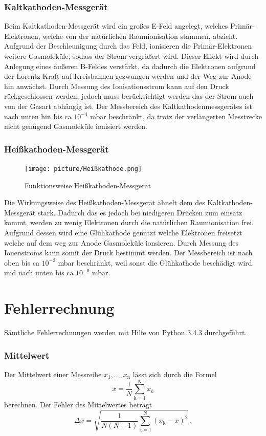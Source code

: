 \subsubsection{Kaltkathoden-Messgerät}
Beim Kaltkathoden-Messgerät wird ein großes E-Feld angelegt, welches Primär-Elektronen, welche von der natürlichen Raumionisation stammen, abzieht. Aufgrund der Beschleunigung durch das Feld, ionisieren die Primär-Elektronen weitere Gasmoleküle, sodass der Strom vergrößert wird. Dieser Effekt wird durch Anlegung eines äußeren B-Feldes verstärkt, da dadurch die Elektronen aufgrund der Lorentz-Kraft auf Kreisbahnen gezwungen werden und der Weg zur Anode hin anwächst. Durch Messung des Ionisationsstrom kann auf den Druck rückgeschlossen werden, jedoch muss berücksichtigt werden das der Strom auch von der Gasart abhängig ist. Der Messbereich des Kaltkathodenmessgerätes ist nach unten hin bis ca $10^{-4}$ mbar beschränkt, da trotz der verlängerten Messtrecke nicht genügend Gasmoleküle ionisiert werden.

\subsubsection{Heißkathoden-Messgerät}
\begin{figure}
  \vspace{-1.0cm}
  \centering
  \texttt{[image: picture/Heißkathode.png]}
  \caption{Funktionsweise Heißkathoden-Messgerät \cite{Heiss}}
  \label{fig:Heißkathode}
  \vspace{-1cm}
\end{figure}
Die Wirkungsweise des Heißkathoden-Messgerät ähnelt dem des Kaltkathoden-Messgerät stark. Dadurch das es jedoch bei niedigeren Drücken zum einsatz kommt, werden zu wenig Elektronen durch die natürlichen Raumionisation frei. Aufgrund dessen wird eine Glühkathode genutzt welche Elektronen freisetzt welche auf dem weg zur Anode Gasmoleküle ionsieren. Durch Messung des Ionenstroms kann somit der Druck bestimmt werden. Der Messbereich ist nach oben bis ca $10^{-2}$ mbar beschränkt, weil sonst die Glühkathode beschädigt wird und nach unten bis ca $10^{-9}$ mbar.
\section{Fehlerrechnung}
Sämtliche Fehlerrechnungen werden mit Hilfe von Python 3.4.3 durchgeführt.
\subsubsection{Mittelwert}
Der Mittelwert einer Messreihe $x_\text{1}, ... ,x_\text{n}$ lässt sich durch die Formel
\begin{equation}
	\overline{x} = \frac{1}{N} \sum_{\text{k}=1}^\text{N} x_k
	\label{eqn:ave}
\end{equation}
berechnen. Der Fehler des Mittelwertes beträgt
\begin{equation}
	\Delta \overline{x} = \sqrt{ \frac{1}{N(N-1)} \sum_{\text{k}=1}^\text{N} (x_\text{k} - \overline{x})^2} \ .
	\label{eqn:std}
\end{equation}

